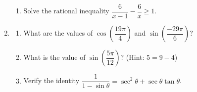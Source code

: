 \documentclass[12pt]{article}
\newcommand{\points}[1]{\marginpar{\hspace{24pt}[#1]}}
\begin{document}
\begin{enumerate}
\begin{enumerate}
 \item Solve the rational inequality $\dfrac{6}{x-1}-\dfrac{6}{x}\geq 1$. \points{4} 
\end{enumerate}

\newpage

\item \begin{enumerate}
       \item What are the values of $\cos\left(\dfrac{19\pi}{4}\right)$ and $\sin\left(\dfrac{-29\pi}{6}\right)$? \points{2}

\vspace{1.5in}

 \item What is the value of $\sin\left(\dfrac{5\pi}{12}\right)$? (Hint: $5=9-4$)\points{4}




 


\vspace{3in}

\item Verify the identity $\dfrac{1}{1-\sin\theta} = \sec^2\theta+\sec\theta\tan\theta$. \points{4}
      \end{enumerate}


\end{enumerate}
\newpage
\end{document}
